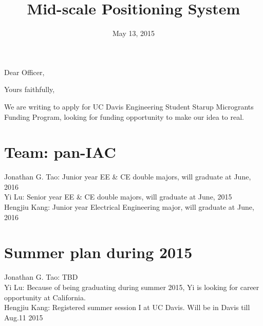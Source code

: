 \documentclass[11pt,a4paper,sans]{moderncv}        %
\title{Mid-scale Positioning System}                               %
\begin{document}
\date{May 13, 2015}
\opening{Dear Officer,}
\closing{Yours faithfully,}
\makelettertitle

We are writing to apply for UC Davis Engineering Student Starup Microgrants Funding Program, looking for funding opportunity to make our idea to real.

\section{Team: pan-IAC}
Jonathan G. Tao: Junior year EE \& CE double majors, will graduate at June, 2016 \\
Yi Lu: Senior year EE \& CE double majors, will graduate at June, 2015 \\
Hengjiu Kang: Junior year Electrical Engineering major, will graduate at June, 2016

\section{Summer plan during 2015}
Jonathan G. Tao: TBD\\
Yi Lu: Because of being graduating during summer 2015, Yi is looking for career opportunity at California.\\
Hengjiu Kang: Registered summer session I at UC Davis. Will be in Davis till Aug.11 2015
\end{document}
